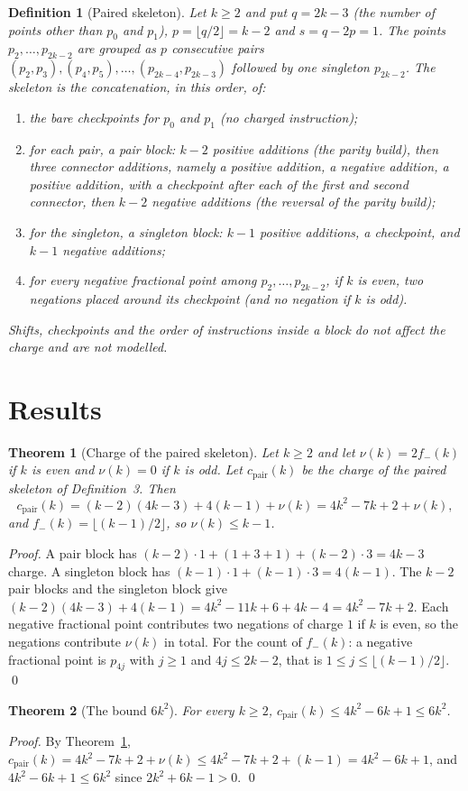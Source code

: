 \documentclass[11pt]{article}
\newtheorem{theorem}{Theorem}
\newtheorem{definition}{Definition}
\begin{document}
\begin{definition}[Paired skeleton]
Let $k\ge2$ and put $q=2k-3$ (the number of points other than $p_0$ and $p_1$), $p=\lfloor q/2\rfloor=k-2$ and $s=q-2p=1$. The points $p_2,\dots,p_{2k-2}$ are grouped as $p$ consecutive pairs $(p_2,p_3),(p_4,p_5),\dots,(p_{2k-4},p_{2k-3})$ followed by one singleton $p_{2k-2}$. The skeleton is the concatenation, in this order, of:
\begin{enumerate}
\item the bare checkpoints for $p_0$ and $p_1$ (no charged instruction);
\item for each pair, a \emph{pair block}: $k-2$ positive additions (the parity build), then three connector additions, namely a positive addition, a negative addition, a positive addition, with a checkpoint after each of the first and second connector, then $k-2$ negative additions (the reversal of the parity build);
\item for the singleton, a \emph{singleton block}: $k-1$ positive additions, a checkpoint, and $k-1$ negative additions;
\item for every negative fractional point among $p_2,\dots,p_{2k-2}$, if $k$ is even, two negations placed around its checkpoint (and no negation if $k$ is odd).
\end{enumerate}
Shifts, checkpoints and the order of instructions inside a block do not affect the charge and are not modelled.
\end{definition}

\section{Results}

\begin{theorem}[Charge of the paired skeleton]\label{thm:charge}
Let $k\ge2$ and let $\nu(k)=2f_-(k)$ if $k$ is even and $\nu(k)=0$ if $k$ is odd. Let $c_{\mathrm{pair}}(k)$ be the charge of the paired skeleton of Definition~3. Then
\[
c_{\mathrm{pair}}(k)=(k-2)(4k-3)+4(k-1)+\nu(k)=4k^2-7k+2+\nu(k),
\]
and $f_-(k)=\lfloor(k-1)/2\rfloor$, so $\nu(k)\le k-1$.
\end{theorem}
\begin{proof}
A pair block has $(k-2)\cdot1+(1+3+1)+(k-2)\cdot3=4k-3$ charge. A singleton block has $(k-1)\cdot1+(k-1)\cdot3=4(k-1)$. The $k-2$ pair blocks and the singleton block give $(k-2)(4k-3)+4(k-1)=4k^2-11k+6+4k-4=4k^2-7k+2$. Each negative fractional point contributes two negations of charge $1$ if $k$ is even, so the negations contribute $\nu(k)$ in total. For the count of $f_-(k)$: a negative fractional point is $p_{4j}$ with $j\ge1$ and $4j\le2k-2$, that is $1\le j\le\lfloor(k-1)/2\rfloor$. \qed
\end{proof}

\begin{theorem}[The bound $6k^2$]\label{thm:bound}
For every $k\ge2$, $c_{\mathrm{pair}}(k)\le4k^2-6k+1\le6k^2$.
\end{theorem}
\begin{proof}
By Theorem~\ref{thm:charge}, $c_{\mathrm{pair}}(k)=4k^2-7k+2+\nu(k)\le4k^2-7k+2+(k-1)=4k^2-6k+1$, and $4k^2-6k+1\le6k^2$ since $2k^2+6k-1>0$. \qed
\end{proof}
\end{document}
